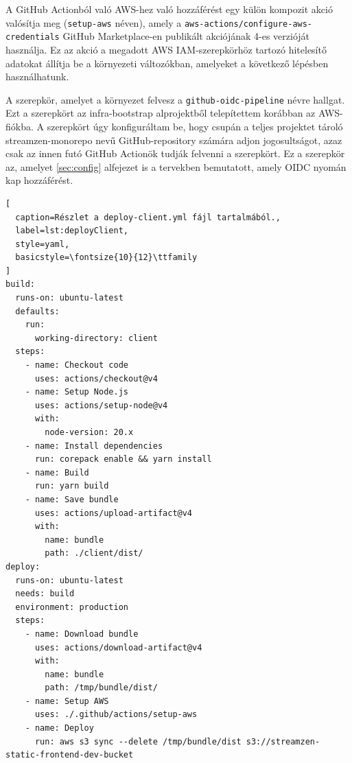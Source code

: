 A GitHub Actionból való AWS-hez való hozzáférést egy külön kompozit akció valósítja meg (\verb|setup-aws| néven), amely a \verb|aws-actions/configure-aws-credentials| GitHub Marketplace-en publikált akciójának 4-es verzióját használja. Ez az akció a megadott AWS IAM-szerepkörhöz tartozó hitelesítő adatokat állítja be a környezeti változókban, amelyeket a következő lépésben használhatunk.

A szerepkör, amelyet a környezet felvesz a \verb|github-oidc-pipeline| névre hallgat. Ezt a szerepkört az infra-bootstrap alprojektből telepítettem korábban az AWS-fiókba. A szerepkört úgy konfiguráltam be, hogy csupán a teljes projektet tároló streamzen-monorepo nevű GitHub-repository számára adjon jogosultságot, azaz csak az innen futó GitHub Actionök tudják felvenni a szerepkört. Ez a szerepkör az, amelyet \ref{sec:config} alfejezet is a tervekben bemutatott, amely OIDC nyomán kap hozzáférést.

\begin{minipage}{0.92\textwidth}
  \begin{lstlisting}[
  caption=Részlet a deploy-client.yml fájl tartalmából.,
  label=lst:deployClient,
  style=yaml,
  basicstyle=\fontsize{10}{12}\ttfamily
]
build:
  runs-on: ubuntu-latest
  defaults:
    run:
      working-directory: client
  steps:
    - name: Checkout code
      uses: actions/checkout@v4
    - name: Setup Node.js
      uses: actions/setup-node@v4
      with:
        node-version: 20.x
    - name: Install dependencies
      run: corepack enable && yarn install
    - name: Build
      run: yarn build
    - name: Save bundle
      uses: actions/upload-artifact@v4
      with:
        name: bundle
        path: ./client/dist/
deploy:
  runs-on: ubuntu-latest
  needs: build
  environment: production
  steps:
    - name: Download bundle
      uses: actions/download-artifact@v4
      with:
        name: bundle
        path: /tmp/bundle/dist/
    - name: Setup AWS
      uses: ./.github/actions/setup-aws
    - name: Deploy
      run: aws s3 sync --delete /tmp/bundle/dist s3://streamzen-static-frontend-dev-bucket
\end{lstlisting}
\end{minipage}
